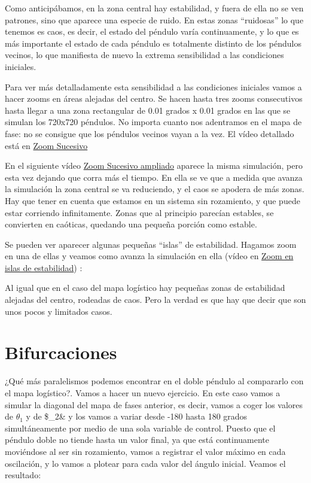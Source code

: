 \documentclass[
  10pt,
  a4paper,
  DIV=11,
  numbers=noendperiod,
  open=any]{scrreprt}
\numberwithin{equation}{chapter}
\numberwithin{equation}{section}
\renewcommand{\[}{\begin{equation}}
\renewcommand{\]}{\end{equation}}
\begin{document}
Como anticipábamos, en la zona central hay estabilidad, y fuera de ella
no se ven patrones, sino que aparece una especie de ruido. En estas
zonas ``ruidosas'' lo que tenemos es caos, es decir, el estado del
péndulo varía continuamente, y lo que es más importante el estado de
cada péndulo es totalmente distinto de los péndulos vecinos, lo que
manifiesta de nuevo la extrema sensibilidad a las condiciones iniciales.

Para ver más detalladamente esta sensibilidad a las condiciones
iniciales vamos a hacer zooms en áreas alejadas del centro. Se hacen
hasta tres zooms consecutivos hasta llegar a una zona rectangular de
0.01 grados x 0.01 grados en las que se simulan los 720x720 péndulos. No
importa cuanto nos adentramos en el mapa de fase: no se consigue que los
péndulos vecinos vayan a la vez. El vídeo detallado está en \href{https://colacaos.github.io/ColaCAOS/02-pendulo-doble/ZoomSucesivo.mp4}{Zoom Sucesivo}

En el siguiente vídeo \href{https://colacaos.github.io/ColaCAOS/02-pendulo-doble/MapaFaseAcelerado.mp4}{Zoom Sucesivo ampliado} aparece la misma simulación, pero esta vez dejando
que corra más el tiempo. En ella se ve que a medida que avanza la
simulación la zona central se va reduciendo, y el caos se apodera de más
zonas. Hay que tener en cuenta que estamos en un sistema sin rozamiento,
y que puede estar corriendo infinitamente. Zonas que al principio
parecían estables, se convierten en caóticas, quedando una pequeña
porción como estable.

Se pueden ver aparecer algunas pequeñas ``islas'' de estabilidad.
Hagamos zoom en una de ellas y veamos como avanza la simulación en ella (vídeo en \href{https://colacaos.github.io/ColaCAOS/02-pendulo-doble/MapaFaseAceleradozoom.mp4}{Zoom en islas de estabilidad}) :

Al igual que en el caso del mapa logístico hay pequeñas zonas de
estabilidad alejadas del centro, rodeadas de caos. Pero la verdad es que
hay que decir que son unos pocos y limitados casos.

\chapter{Bifurcaciones}\label{bifurcaciones}

¿Qué más paralelismos podemos encontrar en el doble péndulo al
compararlo con el mapa logístico?. Vamos a hacer un nuevo ejercicio. En
este caso vamos a simular la diagonal del mapa de fases anterior, es
decir, vamos a coger los valores de \(\theta_1\) y de \$\theta\_2\& y
los vamos a variar desde -180 hasta 180 grados simultáneamente por medio
de una sola variable de control. Puesto que el péndulo doble no tiende
hasta un valor final, ya que está continuamente moviéndose al ser sin
rozamiento, vamos a registrar el valor máximo en cada oscilación, y lo
vamos a plotear para cada valor del ángulo inicial. Veamos el resultado:
\end{document}
